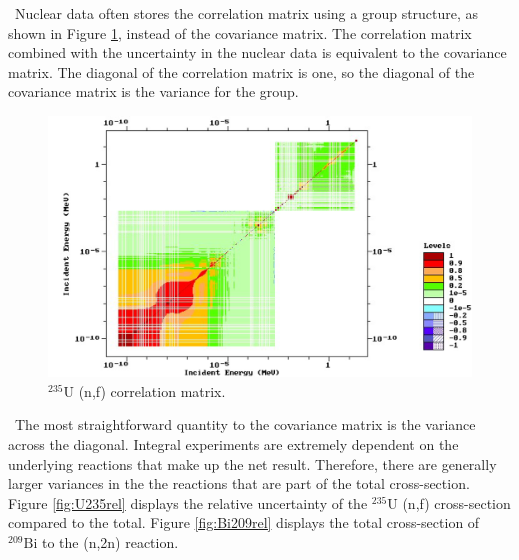 \ Nuclear data often stores the correlation matrix using a group structure, as shown in Figure \ref{fig:coor}, instead of the covariance matrix. 
The correlation matrix combined with the uncertainty in the nuclear data is equivalent to the covariance matrix. 
The diagonal of the correlation matrix is one, so the diagonal of the covariance matrix is the variance for the group.   

\begin{figure}[h]
	\includegraphics[width=\linewidth]{Figures/Chapter2/U235_nf_coor.png}
	\caption[$\mathrm{^{235}U}$ (n,f) correlation matrix.]{$\mathrm{^{235}U}$ (n,f) correlation matrix\cite{ENDF}.}
	\label{fig:coor}
\end{figure}

\ The most straightforward quantity to the covariance matrix is the variance across the diagonal. 
Integral experiments are extremely dependent on the underlying reactions that make up the net result. 
Therefore, there are generally larger variances in the the reactions that are part of the total cross-section. 
Figure \ref{fig:U235rel} displays the relative uncertainty of the $\mathrm{^{235}U}$ (n,f) cross-section compared to the total. 
Figure \ref{fig:Bi209rel} displays the total cross-section of $\mathrm{^{209}Bi}$ to the (n,2n) reaction. 

